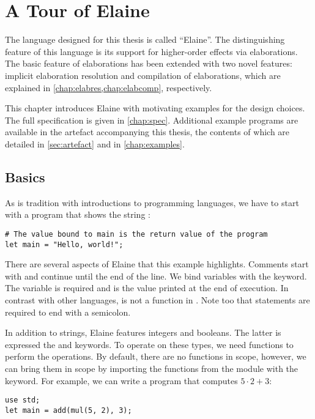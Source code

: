 \chapter{A Tour of Elaine}\label{chap:basics}

The language designed for this thesis is called ``Elaine''. The distinguishing feature of this language is its support for higher-order effects via elaborations. The basic feature of elaborations has been extended with two novel features: implicit elaboration resolution and compilation of elaborations, which are explained in \cref{chap:elabres,chap:elabcomp}, respectively.

This chapter introduces Elaine with motivating examples for the design choices. The full specification is given in \cref{chap:spec}. Additional example programs are available in the artefact accompanying this thesis, the contents of which are detailed in \cref{sec:artefact} and in \cref{chap:examples}.

\section{Basics}

As is tradition with introductions to programming languages, we have to start with a program that shows the string :

\begin{lstlisting}[language=elaine,style=fancy]
# The value bound to main is the return value of the program
let main = "Hello, world!";
\end{lstlisting}

There are several aspects of Elaine that this example highlights. Comments start with \el{#} and continue until the end of the line. We bind variables with the  keyword. The  variable is required and is the value printed at the end of execution. In contrast with other languages,  is not a function in . Note too that statements are required to end with a semicolon.

In addition to strings, Elaine features integers and booleans. The latter is expressed the  and  keywords. To operate on these types, we need functions to perform the operations. By default, there are no functions in scope, however, we can bring them in scope by importing the functions from the  module with the  keyword. For example, we can write a program that computes $5 \cdot 2 + 3$:

\begin{lstlisting}[language=elaine,style=fancy]
use std;
let main = add(mul(5, 2), 3);
\end{lstlisting}

